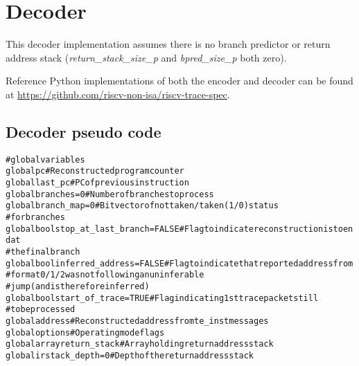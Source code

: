 \chapter{Decoder}

This decoder implementation assumes there is no branch predictor or return address 
stack (\textit{return\_stack\_size\_p} and \textit{bpred\_size\_p} both zero).

Reference Python implementations of both the encoder and decoder can be found at 
\href{https://github.com/riscv-non-isa/riscv-trace-spec}{https://github.com/riscv-non-isa/riscv-trace-spec}.

\section{Decoder pseudo code}

\begin{alltt}
# global variables
global       pc                          # Reconstructed program counter
global       last_pc                     # PC of previous instruction
global       branches = 0                # Number of branches to process
global       branch_map = 0              # Bit vector of not taken/taken (1/0) status
                                         #   for branches
global bool  stop_at_last_branch = FALSE # Flag to indicate reconstruction is to end at
                                         #   the final branch
global bool  inferred_address = FALSE    # Flag to indicate that reported address from
                                         #   format 0/1/2 was not following an uninferable
                                         #   jump (and is therefore inferred)
global bool  start_of_trace = TRUE       # Flag indicating 1st trace packet still
                                         #   to be processed
global       address                     # Reconstructed address from te_inst messages
global       options                     # Operating mode flags
global array return_stack                # Array holding return address stack
global       irstack_depth = 0           # Depth of the return address stack
\end{alltt}

\pagebreak

